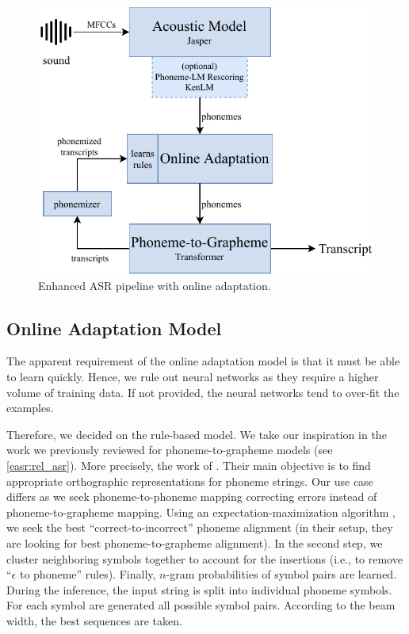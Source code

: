 \begin{figure}[t]
    \centering
    \includegraphics[width=.9\textwidth]{img/online_easr}
    \caption{Enhanced ASR pipeline with online adaptation.}
    \label{fig:online_easr}
\end{figure} 


\subsection{Online Adaptation Model}
The apparent requirement of the online adaptation model is that it must be able to learn quickly. Hence, we rule out neural networks as they require a higher volume of training data. If not provided, the neural networks tend to over-fit the examples. 

Therefore, we decided on the rule-based model. We take our inspiration in the work we previously reviewed for phoneme-to-grapheme models (see \cref{easr:rel_asr}). More precisely, the work of . Their main objective is to find appropriate orthographic representations for phoneme strings. Our use case differs as we seek phoneme-to-phoneme mapping correcting errors instead of phoneme-to-grapheme mapping. Using an expectation-maximization algorithm , we seek the best ``correct-to-incorrect'' phoneme alignment (in their setup, they are looking for best phoneme-to-grapheme alignment). In the second step, we cluster neighboring symbols together to account for the insertions (i.e., to remove ``$\epsilon$ to phoneme'' rules). Finally, $n$-gram probabilities of symbol pairs are learned. During the inference, the input string is split into individual phoneme symbols. For each symbol are generated all possible symbol pairs. According to the beam width, the best sequences are taken. 


